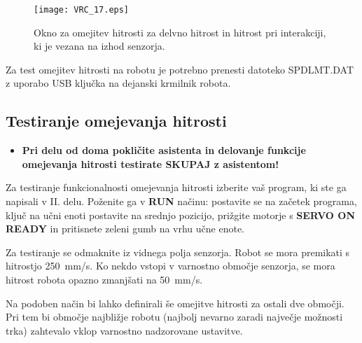 \begin{figure}[hbt]
	\centering
	\texttt{[image: VRC\_17.eps]}
	\caption{Okno za omejitev hitrosti za delvno hitrost in hitrost pri interakciji, ki je vezana na izhod senzorja.}
	\label{fig:VRC_17}
\end{figure}

Za test omejitev hitrosti na robotu je potrebno prenesti datoteko SPDLMT.DAT z uporabo USB ključka na dejanski krmilnik robota.

\subsection{Testiranje omejevanja hitrosti} \label{test3del}

\begin{mdframed}[backgroundcolor=red!20, shadow=true,roundcorner=8pt]
	\begin{itemize}
		\item \textbf{Pri delu od doma pokličite asistenta in delovanje funkcije omejevanja hitrosti testirate SKUPAJ z asistentom!}		
	\end{itemize}
\end{mdframed}

Za testiranje funkcionalnosti omejevanja hitrosti izberite vaš program, ki ste ga napisali v II. delu. Poženite ga v \textbf{RUN} načinu: postavite se na začetek programa, ključ na učni enoti postavite na srednjo pozicijo, prižgite motorje s \textbf{SERVO ON READY} in pritisnete zeleni gumb na vrhu učne enote.

Za testiranje se odmaknite iz vidnega polja senzorja. Robot se mora premikati s hitrostjo 250~mm/s. Ko nekdo vstopi v varnostno območje senzorja, se mora hitrost robota opazno zmanjšati na 50~mm/s.

Na podoben način bi lahko definirali še omejitve hitrosti za ostali dve območji. Pri tem bi območje najbližje robotu (najbolj nevarno zaradi največje možnosti trka) zahtevalo vklop varnostno nadzorovane ustavitve.



